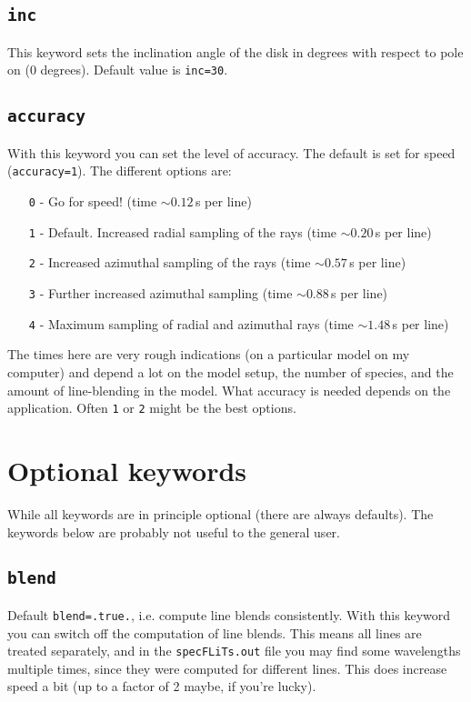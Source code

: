 \documentclass[12pt]{article}
\begin{document}
\subsection*{\texttt{inc}}

This keyword sets the inclination angle of the disk in degrees with respect to pole on (0 degrees). Default value is \texttt{inc=30}.

\subsection*{\texttt{accuracy}}

With this keyword you can set the level of accuracy. The default is set for speed (\texttt{accuracy=1}). The different options are:
\begin{itemize}
\item[\texttt{0} -] Go for speed! (time $\sim 0.12\,$s per line)
\item[\texttt{1} -] Default. Increased radial sampling of the rays (time $\sim 0.20\,$s per line)
\item[\texttt{2} -] Increased azimuthal sampling of the rays (time $\sim 0.57\,$s per line)
\item[\texttt{3} -] Further increased azimuthal sampling (time $\sim 0.88\,$s per line)
\item[\texttt{4} -] Maximum sampling of radial and azimuthal rays (time $\sim 1.48\,$s per line)
\end{itemize}
The times here are very rough indications (on a particular model on my computer) and depend a lot on the model setup, the number of species, and the amount of line-blending in the model. What accuracy is needed depends on the application. Often \texttt{1} or \texttt{2} might be the best options.

\section{Optional keywords}

While all keywords are in principle optional (there are always defaults). The keywords below are probably not useful to the general user.

\subsection*{\texttt{blend}}

Default \texttt{blend=.true.}, i.e. compute line blends consistently. With this keyword you can switch off the computation of line blends. This means all lines are treated separately, and in the \texttt{specFLiTs.out} file you may find some wavelengths multiple times, since they were computed for different lines. This does increase speed a bit (up to a factor of 2 maybe, if you're lucky).
\end{document}
